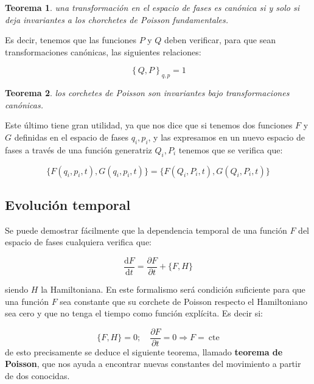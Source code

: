 \documentclass[12pt,a4paper]{article}
\numberwithin{equation}{section}
\numberwithin{figure}{section}
\newcommand{\parciales}[2]{\frac{\partial #1}{\partial #2}}
\newcommand{\D}{\mathrm{d}}
\newcommand{\derivadas}[2]{\frac{\D #1}{\D #2}}
\newcommand{\cte}{\ \mathrm{cte}}
\newtheorem{theorem}{Teorema}[section]
\begin{document}
\begin{theorem}
una transformación en el espacio de fases es canónica si y solo si deja invariantes a los chorchetes de Poisson fundamentales.
\end{theorem}

Es decir, tenemos que las funciones $P$ y $Q$ deben verificar, para que sean transformaciones canónicas, las siguientes relaciones:

\begin{equation}
\left\lbrace Q , P \right\rbrace_{q,p} = 1 
\end{equation}

\begin{theorem}
los corchetes de Poisson son invariantes bajo transformaciones canónicas.
\end{theorem}

Este último tiene gran utilidad, ya que nos dice que si tenemos dos funciones $F$ y $G$ definidas en el espacio de fases $q_i,p_i$, y las expresamos en un nuevo espacio de fases a través de una función generatriz $Q_i, P_i$ tenemos que se verifica que:


\begin{equation}
\{ F(q_i,p_i,t), G(q_i,p_i,t) \} = \{ F(Q_i,P_i,t), G(Q_i,P_i,t) \}  
\end{equation}


\subsection{Evolución temporal}

Se puede demostrar fácilmente que la dependencia temporal de una función $F$ del espacio de fases cualquiera verifica que:

\begin{equation}
\derivadas{F}{t} = \parciales{F}{t} + \{ F, H \}
\end{equation}

siendo $H$ la Hamiltoniana. En este formalismo será condición suficiente para que una función $F$ sea constante que su corchete de Poisson respecto el Hamiltoniano sea cero y que no tenga el tiempo como función explícita. Es decir si:

\begin{equation}
\{ F, H \} = 0; \quad \parciales{F}{t} = 0 \Longrightarrow F = \cte
\end{equation}
de esto precisamente se deduce el siguiente teorema, llamado \textbf{teorema de Poisson}, que nos ayuda a encontrar nuevas constantes del movimiento a partir de dos conocidas. 
\end{document}
